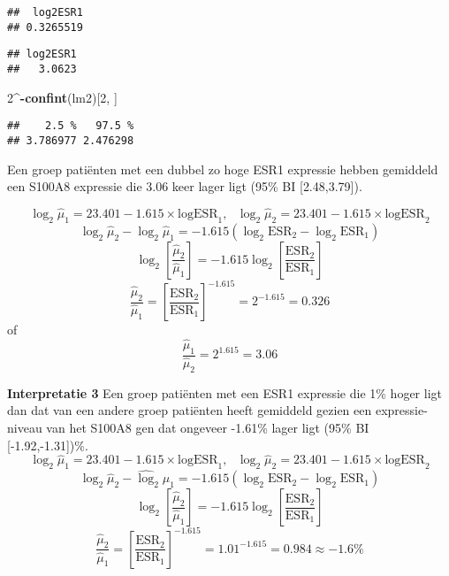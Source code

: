 \documentclass[12pt,dutch,coursenotes]{book}
\newenvironment{Shaded}{\begin{snugshade}}{\end{snugshade}}
\newcommand{\KeywordTok}[1]{\textcolor[rgb]{0.13,0.29,0.53}{\textbf{#1}}}
\newcommand{\DecValTok}[1]{\textcolor[rgb]{0.00,0.00,0.81}{#1}}
\newcommand{\OperatorTok}[1]{\textcolor[rgb]{0.81,0.36,0.00}{\textbf{#1}}}
\newcommand{\NormalTok}[1]{#1}
\theoremstyle{definition}
\theoremstyle{definition}
\theoremstyle{definition}
\theoremstyle{remark}
\begin{document}
\begin{verbatim}
##  log2ESR1 
## 0.3265519
\end{verbatim}

\begin{Shaded}
\end{Shaded}

\begin{verbatim}
## log2ESR1 
##   3.0623
\end{verbatim}

\begin{Shaded}
\begin{Highlighting}[]
\DecValTok{2}\OperatorTok{^-}\KeywordTok{confint}\NormalTok{(lm2)[}\DecValTok{2}\NormalTok{, ]}
\end{Highlighting}
\end{Shaded}

\begin{verbatim}
##    2.5 %   97.5 % 
## 3.786977 2.476298
\end{verbatim}

Een groep patiënten met een dubbel zo hoge ESR1 expressie hebben
gemiddeld een S100A8 expressie die 3.06 keer lager ligt (95\% BI
{[}2.48,3.79{]}).

\[\log_2 \hat\mu_1=23.401  -1.615 \times \text{logESR}_1,\text{ } \log_2 \hat\mu_2=23.401  -1.615 \times \text{logESR}_2 \]
\[\log_2 \hat\mu_2-\log_2 \hat\mu_1=  -1.615 (\log_2 \text{ESR}_2-\log_2 \text{ESR}_1) \]
\[\log_2 \left[\frac{\hat\mu_2}{\hat\mu_1}\right]=  -1.615 \log_2\left[\frac{ \text{ESR}_2}{\text{ESR}_1}\right] \]
\[\frac{\hat\mu_2}{\hat\mu_1}=\left[\frac{ \text{ESR}_2}{\text{ESR}_1}\right]^{-1.615}=2^ {-1.615} =0.326\]
of \[\frac{\hat\mu_1}{\hat\mu_2}=2^{1.615} =3.06\]

\textbf{Interpretatie 3} Een groep patiënten met een ESR1 expressie die
1\% hoger ligt dan dat van een andere groep patiënten heeft gemiddeld
gezien een expressie-niveau van het S100A8 gen dat ongeveer -1.61\%
lager ligt (95\% BI {[}-1.92,-1.31{]})\%.
\[\log_2 \hat\mu_1=23.401  -1.615 \times \text{logESR}_1,\text{ } \log_2 \hat\mu_2=23.401  -1.615 \times \text{logESR}_2 \]
\[\log_2 \hat\mu_2-\hat\log_2 \mu_1=  -1.615 (\log_2 \text{ESR}_2-\log_2 \text{ESR}_1) \]
\[\log_2 \left[\frac{\hat\mu_2}{\hat\mu_1}\right]=  -1.615 \log_2\left[\frac{ \text{ESR}_2}{\text{ESR}_1}\right] \]
\[\frac{\hat\mu_2}{\hat\mu_1}=\left[\frac{ \text{ESR}_2}{\text{ESR}_1}\right]^{-1.615}=1.01^ {-1.615} =0.984 \approx -1.6\%\]
\end{document}
